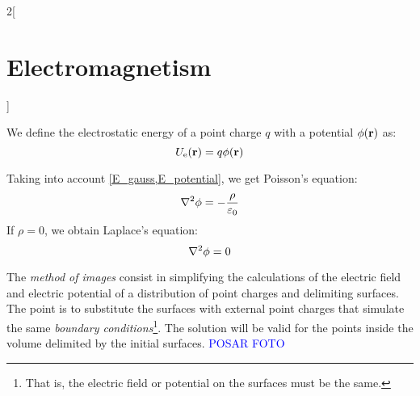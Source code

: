 \documentclass[../../../main.tex]{subfiles}
\begin{document}
\begin{multicols}{2}[\section{Electromagnetism}]
\begin{definition}
    We define the electrostatic energy of a point charge $q$ with a potential $\phi(\boldsymbol{\mathrm{r}})$ as: $$U_\text{e}(\boldsymbol{\mathrm{r}})=q\phi(\boldsymbol{\mathrm{r}})$$
  \end{definition}
  \begin{proposition}
    Taking into account \cref{E_gauss,E_potential}, we get Poisson's equation: $$\laplacian\phi=-\frac{\rho}{\varepsilon_0}$$ If $\rho=0$, we obtain Laplace's equation: $$\laplacian\phi=0$$
  \end{proposition}
  \begin{proposition}
    The \emph{method of images} consist in simplifying the calculations of the electric field and electric potential of a distribution of point charges and delimiting surfaces. The point is to substitute the surfaces with external point charges that simulate the same \emph{boundary conditions}\footnote{That is, the electric field or potential on the surfaces must be the same.}. The solution will be valid for the points inside the volume delimited by the initial surfaces. \textcolor{blue}{POSAR FOTO}
  \end{proposition}

\end{multicols}
\end{document}
